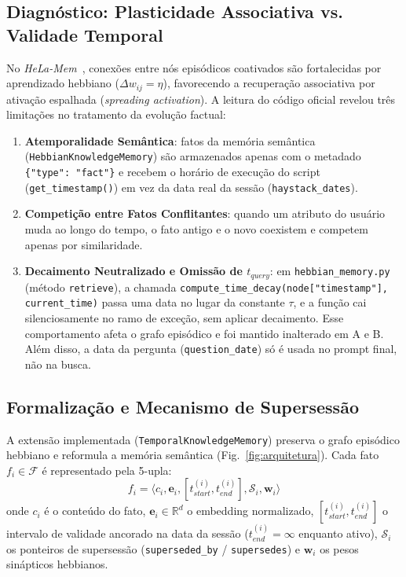 \documentclass[10pt,conference,twocolumn]{IEEEtran}
\begin{document}
\subsection{Diagnóstico: Plasticidade Associativa vs. Validade Temporal}
No \textit{HeLa-Mem}~\cite{helamem2026}, conexões entre nós episódicos coativados são fortalecidas por aprendizado hebbiano ($\Delta w_{ij} = \eta$), favorecendo a recuperação associativa por ativação espalhada (\textit{spreading activation}). A leitura do código oficial revelou três limitações no tratamento da evolução factual:
\begin{enumerate}
    \item \textbf{Atemporalidade Semântica}: fatos da memória semântica (\texttt{HebbianKnowledgeMemory}) são armazenados apenas com o metadado \texttt{\{"type": "fact"\}} e recebem o horário de execução do script (\texttt{get\_timestamp()}) em vez da data real da sessão (\texttt{haystack\_dates}).
    \item \textbf{Competição entre Fatos Conflitantes}: quando um atributo do usuário muda ao longo do tempo, o fato antigo e o novo coexistem e competem apenas por similaridade.
    \item \textbf{Decaimento Neutralizado e Omissão de $t_{query}$}: em \texttt{hebbian\_memory.py} (método \texttt{retrieve}), a chamada \texttt{compute\_time\_decay(node["timestamp"], current\_time)} passa uma data no lugar da constante $\tau$, e a função cai silenciosamente no ramo de exceção, sem aplicar decaimento. Esse comportamento afeta o grafo episódico e foi mantido inalterado em A e B. Além disso, a data da pergunta (\texttt{question\_date}) só é usada no prompt final, não na busca.
\end{enumerate}

\subsection{Formalização e Mecanismo de Supersessão}
A extensão implementada (\texttt{TemporalKnowledgeMemory}) preserva o grafo episódico hebbiano e reformula a memória semântica (Fig.~\ref{fig:arquitetura}). Cada fato $f_i \in \mathcal{F}$ é representado pela 5-upla:
\begin{equation}
f_i = \langle c_i, \mathbf{e}_i, [t_{start}^{(i)}, t_{end}^{(i)}], \mathcal{S}_i, \mathbf{w}_i \rangle
\end{equation}
onde $c_i$ é o conteúdo do fato, $\mathbf{e}_i \in \mathbb{R}^d$ o embedding normalizado, $[t_{start}^{(i)}, t_{end}^{(i)}]$ o intervalo de validade ancorado na data da sessão ($t_{end}^{(i)} = \infty$ enquanto ativo), $\mathcal{S}_i$ os ponteiros de supersessão (\texttt{superseded\_by} / \texttt{supersedes}) e $\mathbf{w}_i$ os pesos sinápticos hebbianos.
\end{document}
